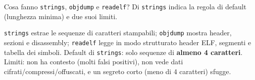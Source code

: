 \question[4]
Cosa fanno \lstinline|strings|, \lstinline|objdump| e \lstinline|readelf|?
Di \lstinline|strings| indica la regola di default (lunghezza minima) e due suoi limiti.
\begin{solution}
\lstinline|strings| estrae le sequenze di caratteri stampabili; \lstinline|objdump| mostra header, sezioni e disassembly; \lstinline|readelf| legge in modo strutturato header ELF, segmenti e tabella dei simboli.
Default di \lstinline|strings|: solo sequenze di \textbf{almeno 4 caratteri}. Limiti: non ha contesto (molti falsi positivi), non vede dati cifrati/compressi/offuscati, e un segreto corto (meno di 4 caratteri) sfugge.
\end{solution}
